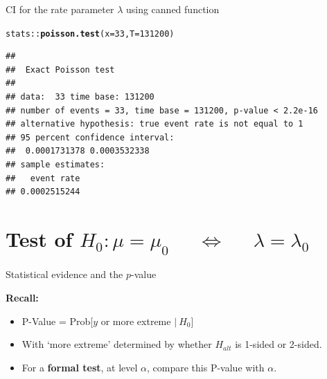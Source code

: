 \documentclass[handout]{beamer}\usepackage[]{graphicx}\usepackage[]{color}
\newcommand{\hlnum}[1]{\textcolor[rgb]{0.686,0.059,0.569}{#1}}%
\newcommand{\hlopt}[1]{\textcolor[rgb]{0,0,0}{#1}}%
\newcommand{\hlstd}[1]{\textcolor[rgb]{0.345,0.345,0.345}{#1}}%
\newcommand{\hlkwc}[1]{\textcolor[rgb]{0.333,0.667,0.333}{#1}}%
\newcommand{\hlkwd}[1]{\textcolor[rgb]{0.737,0.353,0.396}{\textbf{#1}}}%
\newenvironment{knitrout}{}{} %
\begin{document}
\begin{frame}[fragile]{CI for the rate  parameter $\lambda$ using canned function}

\begin{knitrout}\scriptsize
{}\color{fgcolor}
\begin{alltt}
\hlstd{stats}\hlopt{::}\hlkwd{poisson.test}\hlstd{(}\hlkwc{x} \hlstd{=} \hlnum{33}\hlstd{,} \hlkwc{T} \hlstd{=} \hlnum{131200}\hlstd{)}
\end{alltt}
\begin{verbatim}
## 
## 	Exact Poisson test
## 
## data:  33 time base: 131200
## number of events = 33, time base = 131200, p-value < 2.2e-16
## alternative hypothesis: true event rate is not equal to 1
## 95 percent confidence interval:
##  0.0001731378 0.0003532338
## sample estimates:
##   event rate 
## 0.0002515244
\end{verbatim}

\end{knitrout}

\end{frame}



\section{Test of $H_{0}: \mu = \mu_{0}$ $\quad \Leftrightarrow \quad$ $\lambda = \lambda_{0}$}


\begin{frame}{Statistical evidence and the $p$-value}

\textbf{Recall:}

\vspace*{1cm}

\begin{itemize}
\setlength\itemsep{1.2em}
\item P-Value = Prob[$y$ or more extreme $ |\:H_{0}$]

\item With `more extreme' determined by whether $H_{alt}$ is  1-sided or 2-sided. 

\item For a \textbf{formal test}, at level $\alpha$, compare this P-value with $\alpha$.
\end{itemize}

\end{frame}
\end{document}
